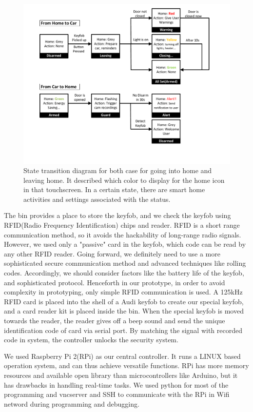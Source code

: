 \begin{figure}[ht]
\label{Fig.StateChange}
\centering
	\includegraphics[keepaspectratio, width=5in]{Figures/Specifications/StateDiagram.pdf}
	\caption{State transition diagram for both case for going into home and leaving home. It described which color to display for the home icon in that touchscreen. In a certain state, there are smart home activities and settings associated with the status.}
\end{figure}

The bin provides a place to store the keyfob, and we check the keyfob using RFID(Radio Frequency Identification) chips and reader. RFID is a short range communication method, so it avoids the hackability of long-range radio signals. However, we used only a "passive" card in the keyfob, which code can be read by any other RFID reader. Going forward, we definitely need to use a more sophisticated secure communication method and advanced techniques like rolling codes. Accordingly, we should consider factors like the battery life of the keyfob, and sophisticated protocol. Henceforth in our prototype, in order to avoid complexity in prototyping, only simple RFID communication is used. A 125kHz RFID card is placed into the shell of a Audi keyfob to create our special keyfob, and a card reader kit is placed inside the bin. When the special keyfob is moved towards the reader, the reader gives off a beep sound and send the unique identification code of card via serial port. By matching the signal with recorded code in system, the controller unlocks the security system.

We used Raspberry Pi 2(RPi) as our central controller. It runs a LINUX based operation system, and can thus achieve versatile functions. RPi has more memory resources and available open library than microcontrollers like Arduino, but it has drawbacks in handling real-time tasks. We used python for most of the programming and vncserver and SSH to communicate with the RPi in Wifi netword during programming and debugging.


